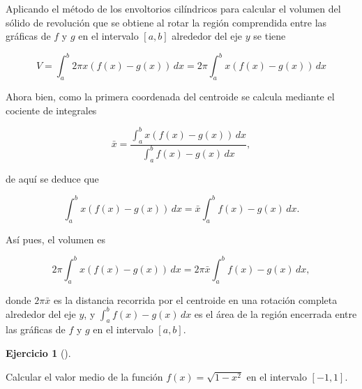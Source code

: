 \documentclass[
  spanish,
  a4paper,
]{scrreport}
\theoremstyle{definition}
\newtheorem{exercise}{Ejercicio}[chapter]
\theoremstyle{remark}
\begin{document}
\begin{tcolorbox}[enhanced jigsaw, arc=.35mm, bottomrule=.15mm, bottomtitle=1mm, breakable, colback=white, colbacktitle=quarto-callout-tip-color!10!white, colframe=quarto-callout-tip-color-frame, coltitle=black, left=2mm, leftrule=.75mm, opacityback=0, opacitybacktitle=0.6, rightrule=.15mm, title=\textcolor{quarto-callout-tip-color}{\faLightbulb}\hspace{0.5em}{Solución}, titlerule=0mm, toprule=.15mm, toptitle=1mm]

Aplicando el método de los envoltorios cilíndricos para calcular el
volumen del sólido de revolución que se obtiene al rotar la región
comprendida entre las gráficas de \(f\) y \(g\) en el intervalo
\([a,b]\) alrededor del eje \(y\) se tiene

\[
V = \int_a^b 2\pi x(f(x)-g(x))\, dx = 2\pi \int_a^b x(f(x)-g(x))\, dx
\]

Ahora bien, como la primera coordenada del centroide se calcula mediante
el cociente de integrales

\[
\bar x = \frac{\int_a^b x (f(x)-g(x))\,dx}{\int_a^b f(x)-g(x)\,dx},
\]

de aquí se deduce que

\[
\int_a^b x(f(x)-g(x))\, dx  = \bar x \int_a^b f(x)-g(x)\,dx.
\]

Así pues, el volumen es

\[
2\pi \int_a^b x(f(x)-g(x))\, dx = 2\pi \bar x \int_a^b f(x)-g(x)\,dx,
\]

donde \(2\pi \bar x\) es la distancia recorrida por el centroide en una
rotación completa alrededor del eje \(y\), y \(\int_a^b f(x)-g(x)\,dx\)
es el área de la región encerrada entre las gráficas de \(f\) y \(g\) en
el intervalo \([a,b]\).

\end{tcolorbox}

\begin{exercise}[]\protect\hypertarget{exr-valor-medio-1}{}\label{exr-valor-medio-1}

Calcular el valor medio de la función \(f(x)=\sqrt{1-x^2}\) en el
intervalo \([-1,1]\).

\end{exercise}
\end{document}

